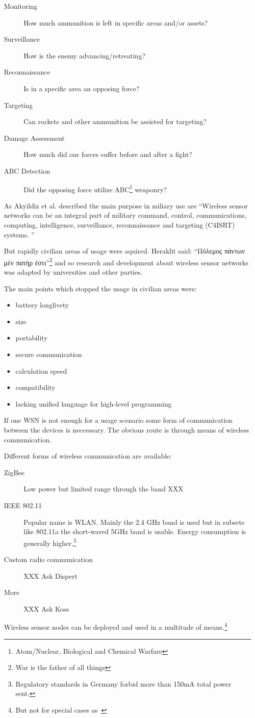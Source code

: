 \begin{description}
    \item[Monitoring] How much ammunition is left in specific areas and/or assets?
    \item[Surveillance] How is the enemy advancing/retreating?
    \item[Reconnaissance] Is in a specific area an opposing force?
    \item[Targeting] Can rockets and other ammunition be assisted for targeting?
    \item[Damage Assessment] How much did our forces suffer before and after a fight?
    \item[ABC Detection] Did the opposing force utilize ABC\footnote{Atom/Nuclear, Biological and Chemical Warfare} weaponry?
\end{description}

As Akyildiz et al. described the main purpose in miliary use are 
``Wireless sensor networks can be an integral part
of military command, control, communications,
computing, intelligence, surveillance, reconnaissance
and targeting (C4ISRT) systems.
''

But rapidly civilian areas of usage were aquired. Heraklit said: ``Πόλεμος πάντων μὲν πατήρ ἐστι''\footnote{War is the father of all things} and so 
research and development about wireless sensor networks was adapted by universities and other parties.


The main points which stopped the usage in civilian areas were:

\begin{itemize}
\item battery longlivety
\item size
\item portability
\item secure communication
\item calculation speed
\item compatibility
\item lacking unified language for high-level programming
\end{itemize}

If one \textsc{WSN} is not enough for a usage scenario some form of communication between the devices is neccessary. The obvious
route is through means of wireless communication.

Different forms of wireless communication are available:

\begin{description}
\item[ZigBee] Low power but limited range through the band XXX
\item[IEEE 802.11] Popular name is \textsc{WLAN}. Mainly the 2.4 GHz band is used but in subsets like 802.11a the short-waved 5GHz band is usable.
Energy consumption is generally higher.\footnote{Regulatory standards in Germany forbid more than 150mA total power sent.}
\item[Custom radio communication] XXX Ask Dispert
\item[More] XXX Ask Koss
\end{description}

Wireless sensor nodes can be deployed and used in a multitude of means.\footnote{But not for special cases as~\cite{biederbeck}}
